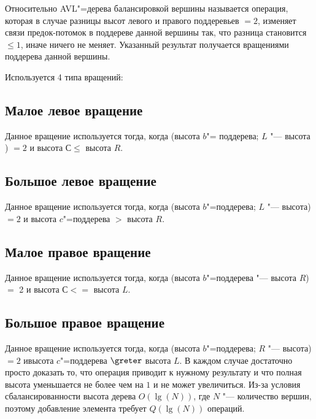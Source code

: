 Относительно AVL"=дерева балансировкой вершины называется операция,
которая в случае разницы высот левого и правого поддеревьев $= 2$,
изменяет связи предок-потомок в поддереве данной вершины так,
что разница становится $ \leqslant 1$, иначе ничего не меняет.
Указанный результат получается вращениями поддерева данной вершины.

Используется 4 типа вращений:

\subsection*{Малое левое вращение}


Данное вращение используется тогда,
когда (высота $b$"= поддерева; $L$ "--- высота )
$= 2$ и высота $С \leqslant$ высота $R$.

\subsection*{Большое левое вращение}


Данное вращение используется тогда,
когда (высота $b$"=поддерева; $L$ "--- высота)
$= 2$ и высота $c$"=поддерева $>$ высота $R$.

\subsection*{Малое правое вращение}


Данное вращение используется тогда,
когда (высота $b$"=поддерева "--- высота $R$)
$=$ 2 и высота $С <=$ высота $L$.

\subsection*{Большое правое вращение}


Данное вращение используется тогда, когда (высота $b$"=поддерева; $R$ "--- высота)
$= 2$ ивысота $c$"=поддерева $ \greter $ высота $L$.
В каждом случае достаточно просто доказать то, 
что операция приводит к нужному результату и
что полная высота уменьшается не более чем на $1$ и не может увеличиться.
Из-за условия сбалансированности высота дерева $O(\lg(N))$,
где $N$ "--- количество вершин, поэтому добавление элемента требует $Q(\lg(N))$ операций.